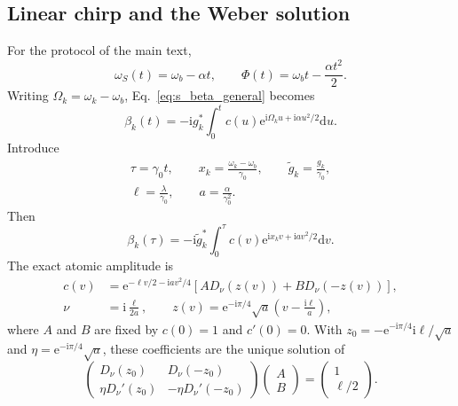 \documentclass[reprint,superscriptaddress,floatfix,amsmath,amssymb,prresearch,aps]{revtex4-2}
\newcommand{\dd}{\mathrm{d}}
\newcommand{\ee}{\mathrm{e}}
\newcommand{\ii}{\mathrm{i}}
\begin{document}
\subsection{Linear chirp and the Weber solution}

For the protocol of the main text,
\begin{equation}
\omega_S(t)=\omega_b-\alpha t,\qquad
\Phi(t)=\omega_bt-\frac{\alpha t^2}{2}.
\label{eq:s_linear}
\end{equation}
Writing \(\Omega_k=\omega_k-\omega_b\), Eq.~\eqref{eq:s_beta_general}
becomes
\begin{equation}
\beta_k(t)=-\ii g_k^*\int_0^t c(u)
\ee^{\ii\Omega_ku+\ii\alpha u^2/2}\dd u.
\label{eq:s_beta_linear_dimensional}
\end{equation}
Introduce
\begin{equation}
\begin{gathered}
\tau=\gamma_0t,\qquad
x_k=\frac{\omega_k-\omega_b}{\gamma_0},\qquad
\widetilde g_k=\frac{g_k}{\gamma_0},\\
\ell=\frac{\lambda}{\gamma_0},\qquad
a=\frac{\alpha}{\gamma_0^2}.
\end{gathered}
\label{eq:s_dimensionless}
\end{equation}
Then
\begin{equation}
\beta_k(\tau)=-\ii\widetilde g_k^*\int_0^\tau c(v)
\ee^{\ii x_kv+\ii av^2/2}\dd v.
\label{eq:s_beta_dimensionless}
\end{equation}
The exact atomic amplitude is
\begin{align}
c(v)&=\ee^{-\ell v/2-\ii av^2/4}
\left[A D_\nu(z(v))+B D_\nu(-z(v))\right],
\label{eq:s_weber}\\
\nu&=\ii\frac{\ell}{2a},\qquad
z(v)=\ee^{-\ii\pi/4}\sqrt a
\left(v-\frac{\ii\ell}{a}\right),
\label{eq:s_weber_parameters}
\end{align}
where \(A\) and \(B\) are fixed by \(c(0)=1\) and \(c'(0)=0\).
With
\(z_0=-\ee^{-\ii\pi/4}\ii\ell/\sqrt a\) and
\(\eta=\ee^{-\ii\pi/4}\sqrt a\), these coefficients are the unique
solution of
\begin{equation}
\begin{pmatrix}
D_\nu(z_0)&D_\nu(-z_0)\\
\eta D_\nu'(z_0)&-\eta D_\nu'(-z_0)
\end{pmatrix}
\begin{pmatrix}A\\B\end{pmatrix}
=\begin{pmatrix}1\\\ell/2\end{pmatrix}.
\label{eq:ABsystem}
\end{equation}
\end{document}
